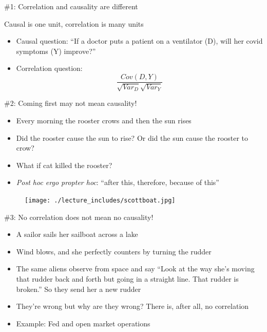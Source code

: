 \documentclass{beamer}
\begin{document}
\begin{frame}{\#1: Correlation and causality are different}

  Causal is one unit, correlation is many units
  \begin{itemize}
    \item Causal question: ``If a doctor puts a patient on a ventilator (D), will her covid symptoms (Y) improve?''
    \item Correlation question:  $$\frac{Cov(D,Y)}{\sqrt{Var_D}\sqrt{{Var_Y}}}$$
  \end{itemize}

\end{frame}


\begin{frame}{\#2: Coming first may not mean causality!}

  \begin{itemize}
    \item Every morning the rooster crows and then the sun rises
    \item Did the rooster cause the sun to rise? Or did the sun cause the rooster to crow?
    \item What if cat killed the rooster?
    \item \emph{Post hoc ergo propter hoc}: ``after this, therefore, because of this''
  \end{itemize}

\end{frame}

\begin{frame}[plain]

  \begin{figure}
    \centering
    \texttt{[image: ./lecture\_includes/scottboat.jpg]}
  \end{figure}

\end{frame}

\begin{frame}{\#3: No correlation does not mean no causality!}

  \begin{itemize}
    \item A sailor sails her sailboat across a lake
    \item Wind blows, and she perfectly counters by turning the rudder
    \item The same aliens observe from space and say ``Look at the way she's moving that rudder back and forth but going in a straight line.  That rudder is broken.'' So they send her a new rudder
    \item They're wrong but why are they wrong? There is, after all, no correlation
    \item Example: Fed and open market operations
  \end{itemize}

\end{frame}
\end{document}
